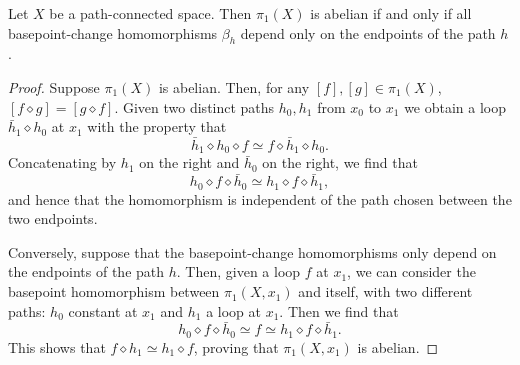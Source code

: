 \documentclass{../../mathnotes}
\begin{document}
\begin{prop}
    Let $X$ be a path-connected space. Then $\pi_1(X)$ is abelian if and only if all basepoint-change homomorphisms $\beta_h$
    depend only on the endpoints of the path $h$.
\end{prop}
\begin{proof}
    Suppose $\pi_1(X)$ is abelian. Then, for any $[f],[g]\in\pi_1(X)$, $[f\diamond g]=[g\diamond f]$. Given two distinct paths
    $h_0,h_1$ from $x_0$ to $x_1$ we obtain a loop $\bar h_1\diamond h_0$ at $x_1$ with the property that
    \[\bar h_1\diamond h_0\diamond f\simeq f\diamond \bar h_1\diamond h_0.\]
    Concatenating by $h_1$ on the right and $\bar h_0$ on the right, we find that
    \[h_0\diamond f\diamond\bar h_0\simeq h_1\diamond f\diamond \bar h_1,\]
    and hence that the homomorphism is independent of the path chosen between the two endpoints.

    Conversely, suppose that the basepoint-change homomorphisms only depend on the endpoints of the path $h$.
    Then, given a loop $f$ at $x_1$, we can consider the basepoint homomorphism between $\pi_1(X,x_1)$ and itself,
    with two different paths: $h_0$ constant at $x_1$ and $h_1$ a loop at $x_1$. Then we find that
    \[h_0\diamond f\diamond \bar h_0\simeq f\simeq h_1\diamond f\diamond \bar h_1.\]
    This shows that $f\diamond h_1\simeq h_1\diamond f$, proving that $\pi_1(X,x_1)$ is abelian.
\end{proof}
\end{document}
